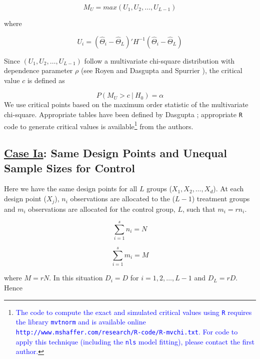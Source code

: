 \documentclass[useAMS]{cJAS2e}
\newcommand{\added}[1]{\textcolor{blue}{#1}}
\begin{document}
\begin{equation}\label{eqn:case-i-max}
	M_U = max(U_1,U_2,\ldots,U_{L-1})
\end{equation}

\noindent where

\begin{equation}\label{eqn:case-i-location}
	U_i = (\hat{\Theta}_i - \hat{\Theta}_L)' H^{-1} (\hat{\Theta}_i - \hat{\Theta}_L)
\end{equation}

Since $(U_1,U_2,\ldots,U_{L-1})$ follow a multivariate chi-square distribution with dependence parameter $\rho$ (see Royen \citet{Royen:1984} and Dasgupta and Spurrier \citet{Dasgupta:1997}), the critical value $c$ is defined as

\begin{equation}\label{eqn:case-i-critical}
	P(M_U > c \ | \ H_0) = \alpha
\end{equation}
We use critical points based on the maximum order statistic of the multivariate chi-square.  Appropriate tables have been defined by Dasgupta \citet{Dasgupta:1996}; appropriate {\tt R} code to generate critical values is available\footnote{\added{The code to compute the exact and simulated critical values using {\tt R} requires the library {\tt mvtnorm} and is available online {\tiny{\tt http://www.mshaffer.com/research/R-code/R-mvchi.txt}}. For code to apply this technique (including the {\tt nls} model fitting), please contact the first author.}} from the authors.

\subsection*{\underline{Case Ia}: Same Design Points and Unequal Sample Sizes for Control}

Here we have the same design points for all $L$ groups ($X_1,X_2,\ldots,X_d$).  At each design point ($X_j$), $n_i$ observations are allocated to the ($L-1$) treatment groups and $m_i$ observations are allocated for the control group, $L$, such that $m_i = r n_i$.

\begin{equation}\label{eqn:case-ii-samples}
	\sum_{i=1}^s n_i = N
\end{equation}

\begin{equation}\label{eqn:case-ii-samplesM}
	\sum_{i=1}^s m_i = M
\end{equation}

\noindent where $M = rN$.  In this situation $D_i = D$ for $i = 1,2,\ldots,L-1$ and $D_L = rD$.  Hence
\end{document}
